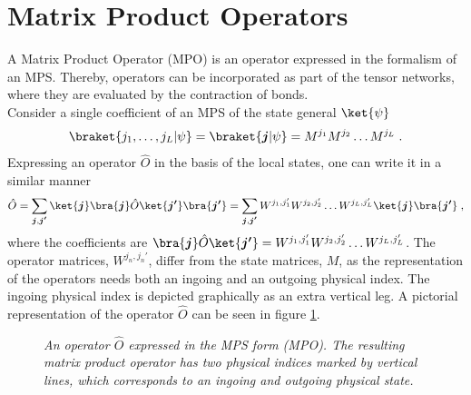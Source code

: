 \section{Matrix Product Operators} \label{sec:MPO}
A Matrix Product Operator (MPO) is an operator expressed in the formalism of an MPS. Thereby, operators can be incorporated as part of the tensor networks, where they are evaluated by the contraction of bonds.\\
Consider a single coefficient of an MPS of the state general $\ket{\psi}$
\begin{equation}
	\braket{j_1 , \ldots , j_L | \psi} = \braket{\boldsymbol{j} | \psi} = M^{j_1} M^{j_2} \ldots M^{j_L} \; . 
\end{equation}
Expressing an operator $\hat{O}$ in the basis of the local states, one can write it in a similar manner
\begin{equation}
	\hat{O} = \sum_{\boldsymbol{j} , \boldsymbol{j'}} \ket{\boldsymbol{j}} \bra{\boldsymbol{j}} \hat{O} \ket{\boldsymbol{j'}} \bra{\boldsymbol{j'}} = \sum_{\boldsymbol{j} , \boldsymbol{j'}} W^{j_1 , j_1 '} W^{j_2 , j_2 '} \ldots W^{j_L , j_L '} \ket{\boldsymbol{j}} \bra{\boldsymbol{j '}} \; ,
	\label{eq:MPOrep}
\end{equation}
where the coefficients are $\bra{\boldsymbol{j}} \hat{O} \ket{\boldsymbol{j'}} = W^{j_1 , j_1 '} W^{j_2 , j_2 '} \ldots W^{j_L , j_L '}$. The operator matrices, $W^{j_n , j_n '}$, differ from the state matrices, $M$, as the representation of the operators needs both an ingoing and an outgoing physical index. The ingoing physical index is depicted graphically as an extra vertical leg. A pictorial representation of the operator $\hat{O}$ can be seen in figure \ref{fig:MPOchain}.
\begin{figure}[h!]
	\centering
	
	\caption{\textit{An operator $\hat{O}$ expressed in the MPS form (MPO). The resulting matrix product operator has two physical indices marked by vertical lines, which corresponds to an ingoing and outgoing physical state.}}
	\label{fig:MPOchain}
\end{figure}


